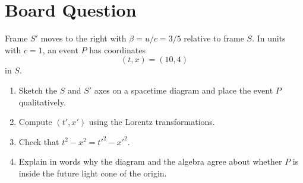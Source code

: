 \documentclass[12pt]{article}
\newif\ifshowboardanswers
\newcommand{\boardanswer}[1]{\ifshowboardanswers\\[0.35em]\textcolor{blue}{\textbf{Answer.} #1}\fi}
\begin{document}
\section*{Board Question}
\begin{tcolorbox}[colback=blue!5!white]
Frame $S'$ moves to the right with $\beta=u/c=3/5$ relative to frame $S$. In units with $c=1$, an event $P$ has coordinates
\[
(t,x)=(10,4)
\]
in $S$.
\begin{enumerate}
    \item Sketch the $S$ and $S'$ axes on a spacetime diagram and place the event $P$ qualitatively.
    \boardanswer{The $t'$ axis is the line $x=\beta t=(3/5)t$ and the $x'$ axis tilts upward with slope $\beta$. The event $P=(10,4)$ is inside the future light cone.}
    \item Compute $(t',x')$ using the Lorentz transformations.
    \boardanswer{$\gamma=5/4$, so $t'=\gamma(t-\beta x)=\frac54(10-\frac35 4)=\frac{19}{2}$ and $x'=\gamma(x-\beta t)=\frac54(4-6)=-\frac52$.}
    \item Check that $t^2-x^2=t'^2-x'^2$.
    \boardanswer{$t^2-x^2=100-16=84$. Also $(19/2)^2-(-5/2)^2=361/4-25/4=84$.}
    \item Explain in words why the diagram and the algebra agree about whether $P$ is inside the future light cone of the origin.
    \boardanswer{Lorentz transformations preserve the light cone and the spacetime interval. Since the interval is positive and $t>0$, all inertial observers agree that $P$ lies inside the future light cone.}
\end{enumerate}
\end{tcolorbox}
\fi
\end{document}
